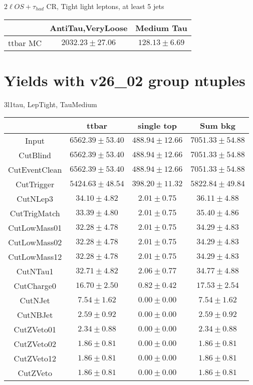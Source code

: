 \documentclass[11pt]{article}
\begin{document}
		$2\ell OS+\tau_{had}$ CR, Tight light leptons, at least 5 jets 
	\begin{table}[h!]
		\begin{tabular}{|c|c|c|}
			\hline 
			  & AntiTau,VeryLoose & Medium Tau \\
			 \hline
			 ttbar MC & $2032.23 \pm 27.06$        & $128.13 \pm 6.69$     \\
			\hline 
		\end{tabular}
	\end{table}%
	

	\newpage
	\section{Yields with v26\_02 group ntuples} 
	
	3l1tau, LepTight, TauMedium\\
	\begin{tabular}{|c|c|c|c|}
\hline
              & ttbar               & single top         & Sum bkg            \\
\hline
Input         & $6562.39 \pm 53.40$ & $488.94 \pm 12.66$ & $7051.33 \pm 54.88$\\
CutBlind      & $6562.39 \pm 53.40$ & $488.94 \pm 12.66$ & $7051.33 \pm 54.88$\\
CutEventClean & $6562.39 \pm 53.40$ & $488.94 \pm 12.66$ & $7051.33 \pm 54.88$\\
CutTrigger    & $5424.63 \pm 48.54$ & $398.20 \pm 11.32$ & $5822.84 \pm 49.84$\\
CutNLep3      &    $34.10 \pm 4.82$ &    $2.01 \pm 0.75$ &    $36.11 \pm 4.88$\\
CutTrigMatch  &    $33.39 \pm 4.80$ &    $2.01 \pm 0.75$ &    $35.40 \pm 4.86$\\
CutLowMass01  &    $32.28 \pm 4.78$ &    $2.01 \pm 0.75$ &    $34.29 \pm 4.83$\\
CutLowMass02  &    $32.28 \pm 4.78$ &    $2.01 \pm 0.75$ &    $34.29 \pm 4.83$\\
CutLowMass12  &    $32.28 \pm 4.78$ &    $2.01 \pm 0.75$ &    $34.29 \pm 4.83$\\
CutNTau1      &    $32.71 \pm 4.82$ &    $2.06 \pm 0.77$ &    $34.77 \pm 4.88$\\
CutCharge0    &    $16.70 \pm 2.50$ &    $0.82 \pm 0.42$ &    $17.53 \pm 2.54$\\
CutNJet       &     $7.54 \pm 1.62$ &    $0.00 \pm 0.00$ &     $7.54 \pm 1.62$\\
CutNBJet      &     $2.59 \pm 0.92$ &    $0.00 \pm 0.00$ &     $2.59 \pm 0.92$\\
CutZVeto01    &     $2.34 \pm 0.88$ &    $0.00 \pm 0.00$ &     $2.34 \pm 0.88$\\
CutZVeto02    &     $1.86 \pm 0.81$ &    $0.00 \pm 0.00$ &     $1.86 \pm 0.81$\\
CutZVeto12    &     $1.86 \pm 0.81$ &    $0.00 \pm 0.00$ &     $1.86 \pm 0.81$\\
CutZVeto      &     $1.86 \pm 0.81$ &    $0.00 \pm 0.00$ &     $1.86 \pm 0.81$\\
\hline
\end{tabular}
\end{document}
